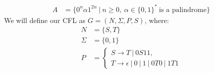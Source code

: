 \documentclass[letterpaper]{article}
\theoremstyle{plain}
\theoremstyle{definition}
\theoremstyle{remark}
\begin{document}
\newpage

\section{}
\begin{align*}
    A&=\{0^n\alpha1^{2n}~|~n\geq{0},~\alpha\in\{0,1\}^*~\text{is a palindrome}\}
\end{align*}
We will define our CFL as $G=(N,\Sigma,P,S)$, where:
\begin{align*}
    N&=\{S,T\}\\
    \Sigma&=\{0,1\}\\
    P&= 
    \left\{
    \begin{array}{l}
       S \to T~|~0S11, \\
       T \to \epsilon~|~0~|~1~|~0T0~|~1T1
    \end{array}
    \right.
\end{align*}
\end{document}
